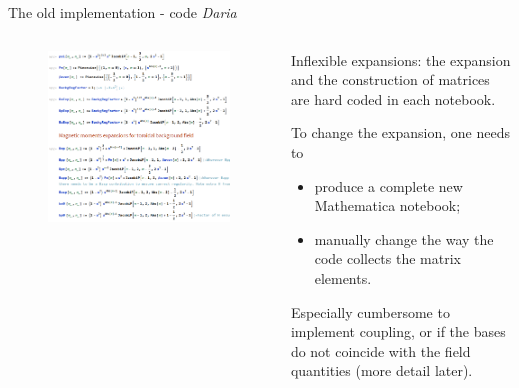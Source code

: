 \documentclass[11pt,aspectratio=169]{beamer}
\begin{document}
\begin{frame}{The old implementation - code \textit{Daria}}
\begin{columns}
\begin{column}{.46\linewidth}
    \begin{figure}
        \centering
        \includegraphics[width=\linewidth]{elements/Mathematica_snippet_expansion.png}
    \end{figure}
\end{column}
\begin{column}{.46\linewidth}
	Inflexible expansions: the expansion and the construction of matrices are hard coded in each notebook.
	\vspace{1em}

	To change the expansion, one needs to 
	\begin{itemize}
		\item produce a complete new Mathematica notebook;
		\item manually change the way the code collects the matrix elements.
	\end{itemize}
	\vspace{1em}

	Especially cumbersome to implement coupling, or if the bases do not coincide with the field quantities (more detail later).
\end{column}
\end{columns}
\end{frame}
\end{document}
